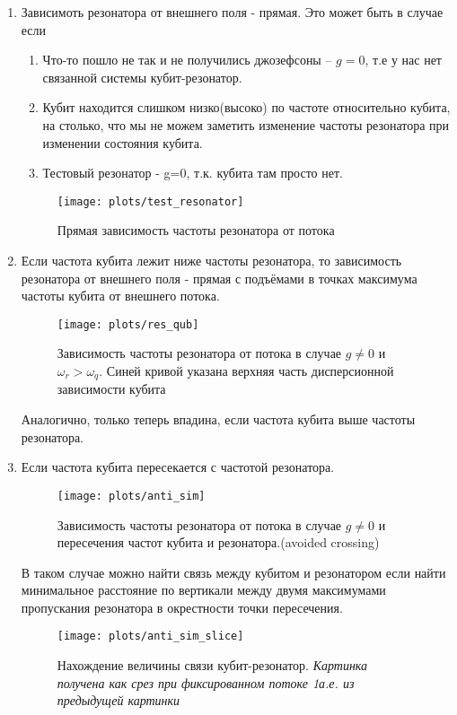 \documentclass[12pt, twoside]{report}
\begin{document}
\begin{enumerate}
\item Зависимоть резонатора от внешнего поля - прямая. Это может быть в случае если 
	\begin{enumerate}
	\item Что-то пошло не так и не получились джозефсоны -- $g=0$, т.е у нас нет связанной системы кубит-резонатор.

	\item Кубит находится слишком низко(высоко) по частоте относительно кубита, на столько, что мы не можем заметить изменение частоты резонатора при изменении состояния кубита.

	\item Тестовый резонатор - g=0, т.к. кубита там просто нет.
	\end{enumerate} 
	\begin{figure}[H]
		\begin{center}
		\texttt{[image: plots/test\_resonator]}
		\caption{Прямая зависимость частоты резонатора от потока}
		\end{center}
		\label{fig:test_res}
	\end{figure}
\item Если частота кубита лежит ниже частоты резонатора, то зависимость резонатора от внешнего поля - прямая с подъёмами в точках максимума частоты кубита от внешнего потока.
	\begin{figure}[H]
		\begin{center}
		\texttt{[image: plots/res\_qub]}
		\caption{Зависимость частоты резонатора от потока в случае $g\neq0$ и $\omega_r>\omega_q$. Синей кривой указана верхняя часть дисперсионной зависимости кубита}
		\end{center}
	\end{figure}
Аналогично, только теперь впадина, если частота кубита выше частоты резонатора.
\item  Если частота кубита пересекается с частотой резонатора.
	\begin{figure}[H]
		\begin{center}
		\texttt{[image: plots/anti\_sim]}
		\caption{Зависимость частоты резонатора от потока в случае $g\neq0$ и пересечения частот кубита и резонатора.(avoided crossing)}
		\end{center}
	\end{figure}
	В таком случае можно найти связь между кубитом и резонатором если найти минимальное расстояние по вертикали между двумя максимумами пропускания резонатора в окрестности точки пересечения.
	\begin{figure}[H]
		\begin{center}
		\texttt{[image: plots/anti\_sim\_slice]}
		\caption{Нахождение величины связи кубит-резонатор.\textit{ Картинка получена как срез при фиксированном потоке 1а.е. из предыдущей картинки}}
		\end{center}
	\end{figure}
\end{enumerate}
\end{document}
